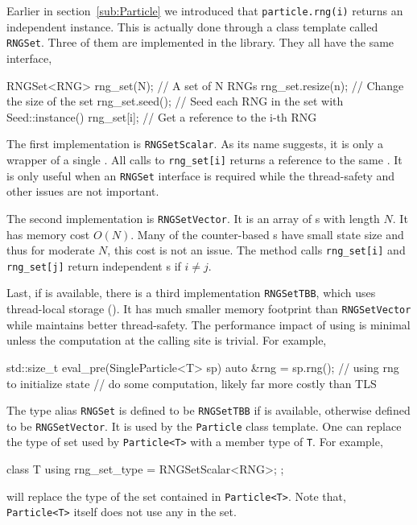 Earlier in section~\ref{sub:Particle} we introduced that \verb|particle.rng(i)|
returns an independent \rng instance. This is actually done through a class
template called \verb|RNGSet|. Three of them are implemented in the library.
They all have the same interface,
\begin{cppcode}
  RNGSet<RNG> rng_set(N); // A set of N RNGs
  rng_set.resize(n);      // Change the size of the set
  rng_set.seed();         // Seed each RNG in the set with Seed::instance()
  rng_set[i];             // Get a reference to the i-th RNG
\end{cppcode}
The first implementation is \verb|RNGSetScalar|. As its name suggests, it is
only a wrapper of a single \rng. All calls to \verb|rng_set[i]| returns a
reference to the same \rng. It is only useful when an \verb|RNGSet| interface
is required while the thread-safety and other issues are not important.

The second implementation is \verb|RNGSetVector|. It is an array of \rng{}s
with length $N$. It has memory cost $O(N)$. Many of the counter-based \rng{}s
have small state size and thus for moderate $N$, this cost is not an issue. The
method calls \verb|rng_set[i]| and \verb|rng_set[j]| return independent \rng{}s
if $i \ne j$.

Last, if \tbb is available, there is a third implementation \verb|RNGSetTBB|,
which uses thread-local storage (\tls). It has much smaller memory footprint
than \verb|RNGSetVector| while maintains better thread-safety. The performance
impact of using \tls is minimal unless the computation at the calling site is
trivial. For example,
\begin{cppcode}
  std::size_t eval_pre(SingleParticle<T> sp)
  {
      auto &rng = sp.rng();
      // using rng to initialize state
      // do some computation, likely far more costly than TLS
  }
\end{cppcode}
The type alias \verb|RNGSet| is defined to be \verb|RNGSetTBB| if \tbb is
available, otherwise defined to be \verb|RNGSetVector|. It is used by the
\verb|Particle| class template. One can replace the type of \rng set used by
\verb|Particle<T>| with a member type of \verb|T|. For example,
\begin{cppcode}
  class T
  {
      using rng_set_type = RNGSetScalar<RNG>;
  };
\end{cppcode}
will replace the type of the \rng set contained in \verb|Particle<T>|.  Note
that, \verb|Particle<T>| itself does not use any \rng in the set.

